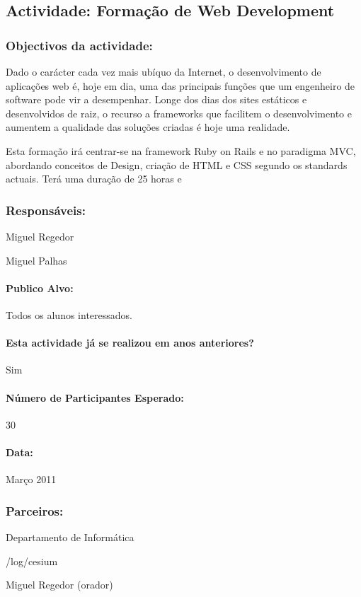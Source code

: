 \subsection{Actividade: Formação de Web Development} %

\subsubsection*{Objectivos da actividade:}
Dado o carácter cada vez mais ubíquo da Internet, o desenvolvimento de aplicações web é, hoje em dia, uma das principais funções que um engenheiro de software pode vir a desempenhar. Longe dos dias dos sites estáticos e desenvolvidos de raiz, o recurso a frameworks que facilitem o desenvolvimento e aumentem a qualidade das soluções criadas é hoje uma realidade.

Esta formação irá centrar-se na framework Ruby on Rails e no paradigma MVC, abordando conceitos de Design, criação de HTML e CSS segundo os standards actuais.
Terá uma duração de 25 horas e
\subsubsection*{Responsáveis:}
\begin{itemizedash}
	\item{Miguel Regedor}
	\item{Miguel Palhas}
\end{itemizedash}

\paragraph{Publico Alvo: }
Todos os alunos interessados.

\paragraph{Esta actividade já se realizou em anos anteriores?}
Sim

\paragraph{Número de Participantes Esperado:}
30

\paragraph{Data:} Março 2011

\subsubsection*{Parceiros:}
\begin{itemizedash}
    \item{Departamento de Informática}
	\item{/log/cesium}
	\item{Miguel Regedor (orador)}
\end{itemizedash}

